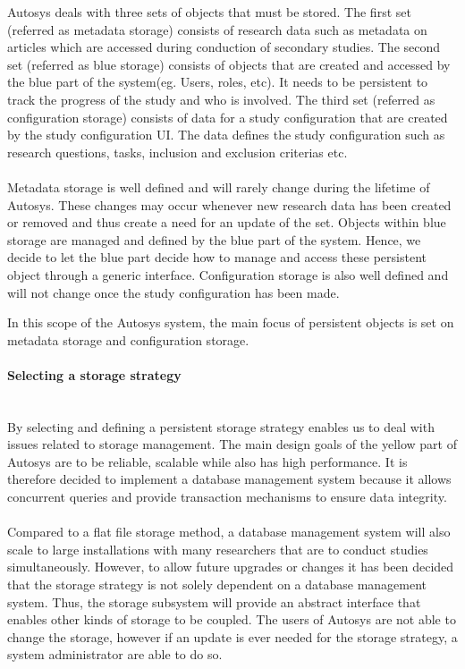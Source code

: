 Autosys deals with three sets of objects that must be stored.  The first set (referred as metadata storage) consists of research data such as metadata on articles which are accessed during conduction of secondary studies. The second set (referred as blue storage) consists of objects that are created and accessed by the blue part of the system(eg. Users, roles, etc). It needs to be persistent to track the progress of the study and who is involved. The third set (referred as configuration storage) consists of data for a study configuration that are created by the study configuration UI. The data defines the study configuration such as research questions, tasks, inclusion and exclusion criterias etc.\\\\ 

Metadata storage is well defined and will rarely change during the lifetime of Autosys. These changes may occur whenever new research data has been created or removed and thus create a need for an update of the set. Objects within blue storage are managed and defined by the blue part of the system. Hence, we decide to let the blue part decide how to manage and access these persistent object through a generic interface. Configuration storage is also well defined and will not change once the study configuration has been made.

In this scope of the Autosys system, the main focus of persistent objects is set on metadata storage and configuration storage.

\paragraph{Selecting a storage strategy}\mbox{}\\
By selecting and defining a persistent storage strategy enables us to deal with issues related to storage management. The main design goals of the yellow part of Autosys are to be reliable, scalable while also has high performance. It is therefore decided to implement a database management system because it allows concurrent queries and provide transaction mechanisms to ensure data integrity. \\\\Compared to a flat file storage method, a database management system will also scale to large installations with many researchers that are to conduct studies simultaneously. However, to allow future upgrades or changes it has been decided that the storage strategy is not solely dependent on a database management system. Thus, the storage subsystem will provide an abstract interface that enables other kinds of storage to be coupled. The users of Autosys are not able to change the storage, however if an update is ever needed for the storage strategy, a system administrator are able to do so. 

